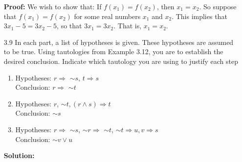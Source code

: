 \begin{enumerate}
      \textbf{Proof:} We wish to show that: If $f(x_1) = f(x_2)$, then
      $x_1 = x_2$. So suppose that $f(x_1) = f(x_2)$ for some real numbers
      $x_1$ and $x_2$. This implies that $3x_1 - 5 = 3x_2 - 5$, so that
      $3x_1 = 3x_2$. That is, $x_1 = x_2$.      
   \item[3.9] In each part, a list of hypotheses is given. These hypotheses are
              assumed to be true. Using tautologies from Example 3.12, you are
              to establish the desired conclusion. Indicate which tautology you
              are using to justify each step
      \begin{enumerate}
         \item Hypotheses: $r \Rightarrow$ $\sim$$s$, $t \Rightarrow s$ \\
               Conclusion: $r \Rightarrow$ $\sim$$t$
         \item Hypotheses: $r$, $\sim$$t, (r \land s) \Rightarrow t$ \\
               Conclusion: $\sim$$s$
         \item Hypotheses: $r \Rightarrow$ $\sim$$s$, $\sim$$r \Rightarrow$
                           $\sim$$t$, $\sim$$t \Rightarrow u, v \Rightarrow s$\\
               Conclusion: $\sim$$v \lor u$
      \end{enumerate}

      \textbf{Solution:}
      

\end{enumerate}
